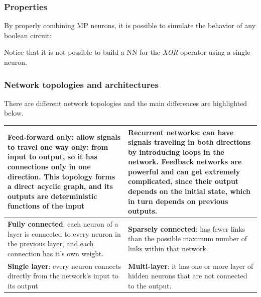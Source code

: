 \subsubsection{Properties}

By properly combining MP neurons, it is possible to simulate the behavior of any boolean circuit:


Notice that it is not possible to build a NN for the \textit{XOR} operator using a single neuron.

\subsubsection{Network topologies and architectures} There are different network topologies and the main differences are highlighted below.

\begin{table}[H]
	\centering
	\begin{tabular}{| p{7.5cm} | p{7.5cm} |}
		\hline
		\textbf{Feed-forward only}: allow signals to travel one way only: from input to output, so it has connections only in one direction. This topology forms a direct acyclic graph, and its outputs are deterministic functions of the input & \textbf{Recurrent networks}: can have signals traveling in both directions by introducing loops in the network. Feedback networks are powerful and can get extremely complicated, since their output depends on the initial state, which in turn depends on previous outputs.\\
		\hline
		\textbf{Fully connected}: each neuron of a layer is connected to every neuron in the previous layer, and each connection has it's own weight. & \textbf{Sparsely connected}: has fewer links than the possible maximum number of links within that network.  \\
		\hline
		\textbf{Single layer}: every neuron connects directly from the network's input to its output & \textbf{Multi-layer}: it has one or more layer of hidden neurons that are not connected to the output.\\
		\hline
	\end{tabular}
\end{table} 


